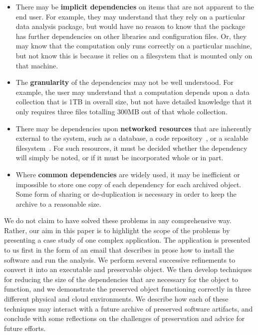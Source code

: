 \documentclass[procedia]{easychair}
\begin{document}
\begin{itemize}
\item There may be {\bf implicit dependencies} on items that are
not apparent to the end user.  For example, they may understand that
they rely on a particular data analysis package, but would have
no reason to know that the package has further dependencies on
other libraries and configuration files.  Or, they may know that
the computation only runs correctly on a particular machine, but
not know this is because it relies on a filesystem that
is mounted only on that machine.

\item The {\bf granularity} of the dependencies may not be well understood.
For example, the user may understand that a computation depends upon
a data collection that is 1TB in overall size, but not have detailed
knowledge that it only requires three files totalling 300MB out of that
whole collection.

\item There may be dependencies upon {\bf networked resources} that
are inherently external to the system, such as a database, a code
repository~\cite{cms2006cmssw}, or a scalable filesystem~\cite{blomer2011cernvm}.  For such resources, it
must be decided whether the dependency will simply be noted, or if it
must be incorporated whole or in part.

\item Where {\bf common dependencies} are widely used, it may be inefficient or
impossible to store one copy of each dependency for each archived object.
Some form of sharing or de-duplication is necessary in order to keep
the archive to a reasonable size.
\end{itemize}

We do not claim to have solved these problems in any comprehensive
way.  Rather, our aim in this paper is to highlight the scope
of the problems by presenting a case study of one complex application.
The application is presented to us
first in the form of an email that describes in prose how to install
the software and run the analysis.  We perform several successive
refinements to convert it into an executable and preservable object.
We then develop techniques for reducing the size of the dependencies
that are necessary for the object to function, and we demonstrate
the preserved object functioning correctly in three different
physical and cloud environments.
We describe how each of these techniques may interact with
a future archive of preserved software artifacts, and conclude with
some reflections on the challenges of preservation and advice for future efforts.
\end{document}
